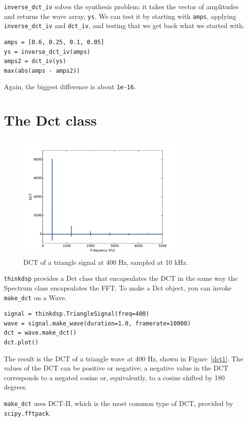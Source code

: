\documentclass[12pt]{book}
\begin{document}
\verb"inverse_dct_iv" solves the synthesis problem: it
takes the vector of amplitudes and returns
the wave array, {\tt ys}.  We can test it by starting
with {\tt amps}, applying \verb"inverse_dct_iv" and \verb"dct_iv",
and testing that we get back what we started with.

\begin{verbatim}
amps = [0.6, 0.25, 0.1, 0.05]
ys = inverse_dct_iv(amps)
amps2 = dct_iv(ys)
max(abs(amps - amps2))
\end{verbatim}

Again, the biggest difference is about {\tt 1e-16}.


\section{The Dct class}

\begin{figure}
\centerline{\includegraphics[height=2.5in]{figs/dct1.pdf}}
\caption{DCT of a triangle signal at 400 Hz, sampled at 10 kHz.}
\label{fig.dct1}
\end{figure}

{\tt thinkdsp} provides a Dct class that encapsulates the
DCT in the same way the Spectrum class encapsulates the FFT.
To make a Dct object, you can invoke \verb"make_dct" on a Wave.

\begin{verbatim}
signal = thinkdsp.TriangleSignal(freq=400)
wave = signal.make_wave(duration=1.0, framerate=10000)
dct = wave.make_dct()
dct.plot()
\end{verbatim}

The result is the DCT of a triangle wave at 400 Hz, shown in
Figure~\ref{dct1}.  The values of the DCT can be positive or negative;
a negative value in the DCT corresponds to a negated cosine or,
equivalently, to a cosine shifted by 180 degrees.

\verb"make_dct" uses DCT-II, which is the most common type of DCT,
provided by {\tt scipy.fftpack}.
\end{document}
